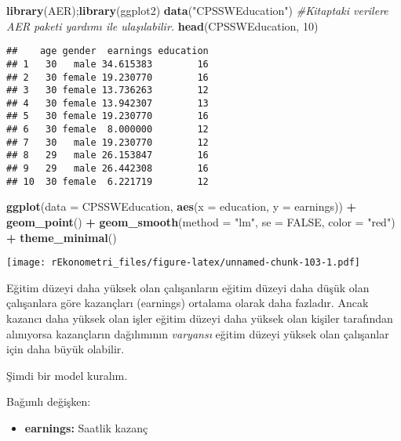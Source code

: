 \documentclass[
]{book}
\newenvironment{Shaded}{\begin{snugshade}}{\end{snugshade}}
\newcommand{\CommentTok}[1]{\textcolor[rgb]{0.56,0.35,0.01}{\textit{#1}}}
\newcommand{\DataTypeTok}[1]{\textcolor[rgb]{0.13,0.29,0.53}{#1}}
\newcommand{\DecValTok}[1]{\textcolor[rgb]{0.00,0.00,0.81}{#1}}
\newcommand{\KeywordTok}[1]{\textcolor[rgb]{0.13,0.29,0.53}{\textbf{#1}}}
\newcommand{\NormalTok}[1]{#1}
\newcommand{\OperatorTok}[1]{\textcolor[rgb]{0.81,0.36,0.00}{\textbf{#1}}}
\newcommand{\OtherTok}[1]{\textcolor[rgb]{0.56,0.35,0.01}{#1}}
\newcommand{\StringTok}[1]{\textcolor[rgb]{0.31,0.60,0.02}{#1}}
\providecommand{\tightlist}{%
  \setlength{\itemsep}{0pt}\setlength{\parskip}{0pt}}
\begin{document}
\begin{Shaded}
\begin{Highlighting}[]
\KeywordTok{library}\NormalTok{(AER);}\KeywordTok{library}\NormalTok{(ggplot2)}
\KeywordTok{data}\NormalTok{(}\StringTok{"CPSSWEducation"}\NormalTok{) }\CommentTok{#Kitaptaki verilere AER paketi yardımı ile ulaşılabilir.}
\KeywordTok{head}\NormalTok{(CPSSWEducation, }\DecValTok{10}\NormalTok{)}
\end{Highlighting}
\end{Shaded}

\begin{verbatim}
##    age gender  earnings education
## 1   30   male 34.615383        16
## 2   30 female 19.230770        16
## 3   30 female 13.736263        12
## 4   30 female 13.942307        13
## 5   30 female 19.230770        16
## 6   30 female  8.000000        12
## 7   30   male 19.230770        12
## 8   29   male 26.153847        16
## 9   29   male 26.442308        16
## 10  30 female  6.221719        12
\end{verbatim}

\begin{Shaded}
\begin{Highlighting}[]
\KeywordTok{ggplot}\NormalTok{(}\DataTypeTok{data =}\NormalTok{ CPSSWEducation, }\KeywordTok{aes}\NormalTok{(}\DataTypeTok{x =}\NormalTok{ education, }\DataTypeTok{y =}\NormalTok{ earnings)) }\OperatorTok{+}
\StringTok{  }\KeywordTok{geom_point}\NormalTok{() }\OperatorTok{+}
\StringTok{  }\KeywordTok{geom_smooth}\NormalTok{(}\DataTypeTok{method =} \StringTok{"lm"}\NormalTok{, }\DataTypeTok{se =} \OtherTok{FALSE}\NormalTok{, }\DataTypeTok{color =} \StringTok{"red"}\NormalTok{) }\OperatorTok{+}
\StringTok{  }\KeywordTok{theme_minimal}\NormalTok{()}
\end{Highlighting}
\end{Shaded}

\texttt{[image: rEkonometri\_files/figure-latex/unnamed-chunk-103-1.pdf]}

Eğitim düzeyi daha yüksek olan çalışanların eğitim düzeyi daha düşük olan çalışanlara göre kazançları (earnings) ortalama olarak daha fazladır. Ancak kazancı daha yüksek olan işler eğitim düzeyi daha yüksek olan kişiler tarafından alınıyorsa kazançların dağılımının \emph{varyansı} eğitim düzeyi yüksek olan çalışanlar için daha büyük olabilir.

Şimdi bir model kuralım.

Bağımlı değişken:

\begin{itemize}
\tightlist
\item
  \textbf{earnings:} Saatlik kazanç
\end{itemize}
\end{document}
